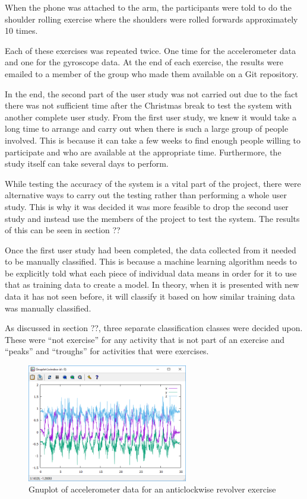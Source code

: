 When the phone was attached to the arm, the participants were told to do the shoulder rolling exercise where the shoulders were rolled forwards approximately 10 times.

Each of these exercises was repeated twice. One time for the accelerometer data and one for the gyroscope data. At the end of each exercise, the results were emailed to a member of the group who made them available on a Git repository.

In the end, the second part of the user study was not carried out due to the fact there was not sufficient time after the Christmas break to test the system with another complete user study. From the first user study, we knew it would take a long time to arrange and carry out when there is such a large group of people involved. This is because it can take a few weeks to find enough people willing to participate and who are available at the appropriate time. Furthermore, the study itself can take several days to perform. 

While testing the accuracy of the system is a vital part of the project, there were alternative ways to carry out the testing rather than performing a whole user study. This is why it was decided it was more feasible to drop the second user study and instead use the members of the project to test the system. The results of this can be seen in section ??

Once the first user study had been completed, the data collected from it needed to be manually classified. This is because a machine learning algorithm needs to be explicitly told what each piece of individual data means in order for it to use that as training data to create a model. In theory, when it is presented with new data it has not seen before, it will classify it based on how similar training data was manually classified.

As discussed in section ??, three separate classification classes were decided upon. These were “not exercise” for any activity that is not part of an exercise and “peaks” and “troughs” for activities that were exercises. 

\begin{figure}
	\centering
	\includegraphics[width=70mm]{figures/classification_data_plot.png}
	\caption{Gnuplot of accelerometer data for an anticlockwise revolver exercise\label{fig:gnuplot-rev}}
\end{figure}


